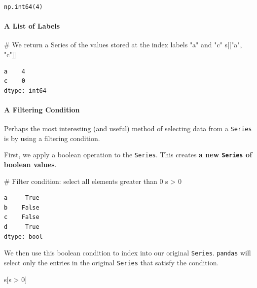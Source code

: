 \documentclass[
  letterpaper,
  DIV=11,
  numbers=noendperiod]{scrreprt}
\let\oldparagraph\paragraph
\renewcommand{\paragraph}[1]{\oldparagraph{#1}\mbox{}}
\newenvironment{Shaded}{\begin{snugshade}}{\end{snugshade}}
\newcommand{\CommentTok}[1]{\textcolor[rgb]{0.37,0.37,0.37}{#1}}
\newcommand{\DecValTok}[1]{\textcolor[rgb]{0.68,0.00,0.00}{#1}}
\newcommand{\NormalTok}[1]{\textcolor[rgb]{0.00,0.23,0.31}{#1}}
\newcommand{\OperatorTok}[1]{\textcolor[rgb]{0.37,0.37,0.37}{#1}}
\newcommand{\StringTok}[1]{\textcolor[rgb]{0.13,0.47,0.30}{#1}}
\begin{document}
\begin{verbatim}
np.int64(4)
\end{verbatim}

\paragraph{A List of Labels}\label{a-list-of-labels}

\begin{Shaded}
\begin{Highlighting}[]
\CommentTok{\# We return a Series of the values stored at the index labels "a" and "c"}
\NormalTok{s[[}\StringTok{"a"}\NormalTok{, }\StringTok{"c"}\NormalTok{]] }
\end{Highlighting}
\end{Shaded}

\begin{verbatim}
a    4
c    0
dtype: int64
\end{verbatim}

\paragraph{A Filtering Condition}\label{a-filtering-condition}

Perhaps the most interesting (and useful) method of selecting data from
a \texttt{Series} is by using a filtering condition.

First, we apply a boolean operation to the \texttt{Series}. This creates
\textbf{a new \texttt{Series} of boolean values}.

\begin{Shaded}
\begin{Highlighting}[]
\CommentTok{\# Filter condition: select all elements greater than 0}
\NormalTok{s }\OperatorTok{\textgreater{}} \DecValTok{0} 
\end{Highlighting}
\end{Shaded}

\begin{verbatim}
a     True
b    False
c    False
d     True
dtype: bool
\end{verbatim}

We then use this boolean condition to index into our original
\texttt{Series}. \texttt{pandas} will select only the entries in the
original \texttt{Series} that satisfy the condition.

\begin{Shaded}
\begin{Highlighting}[]
\NormalTok{s[s }\OperatorTok{\textgreater{}} \DecValTok{0}\NormalTok{] }
\end{Highlighting}
\end{Shaded}
\end{document}

